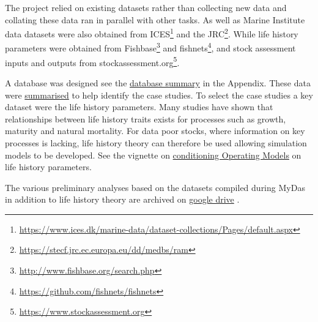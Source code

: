 The project relied on existing datasets rather than collecting new data and collating these data ran in parallel with other tasks. As well as Marine Institute data datasets were also obtained from ICES\footnote{\url{https://www.ices.dk/marine-data/dataset-collections/Pages/default.aspx}} and the JRC\footnote{\url{https://stecf.jrc.ec.europa.eu/dd/medbs/ram}}. While life history parameters were obtained from Fishbase\footnote{\url{http://www.fishbase.org/search.php}} and fishnets\footnote{\url{https://github.com/fishnets/fishnets}}, and stock assessment inputs and outputs from stockassessment.org\footnote{\url{https://www.stockassessment.org}}.

A database was designed see the \hyperref[appendix:db]{database summary} in the Appendix. These data were \href{https://3o2y9wugzp1kfxr5hvzgzq-on.drv.tw/MyDas/tasks/1/stockprioritisation.nb.html}{summarised} to help identify the case studies. To select the case studies a key dataset were the life history parameters. Many studies have shown that relationships between life history traits exists for processes such as growth, maturity and natural mortality. For data poor stocks, where information on key processes is lacking, life history theory can therefore be used allowing simulation models to be developed.  See the vignette on \href{https://3o2y9wugzp1kfxr5hvzgzq-on.drv.tw/MyDas/vignettes/conditioning.html}{conditioning Operating Models} on life history parameters. 

The various preliminary analyses based on the datasets compiled during MyDas in addition to life history theory are archived on \href{https://drive.google.com/drive/folders/1pzXh8j-Y4dtJikFqP7RUuwBu0XY0a9ao?usp=sharing}{google drive} .


